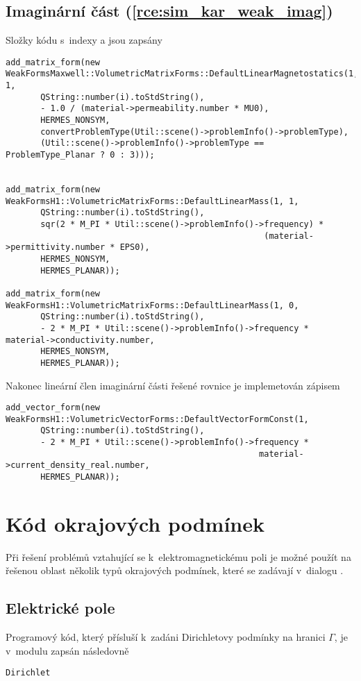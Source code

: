 \subsection*{Imaginární část (\ref{rce:sim_kar_weak_imag})}
Složky kódu s~indexy  a  jsou zapsány
\begin{verbatim}
add_matrix_form(new WeakFormsMaxwell::VolumetricMatrixForms::DefaultLinearMagnetostatics(1, 1,
       QString::number(i).toStdString(),
       - 1.0 / (material->permeability.number * MU0),
       HERMES_NONSYM,
       convertProblemType(Util::scene()->problemInfo()->problemType),
       (Util::scene()->problemInfo()->problemType == ProblemType_Planar ? 0 : 3)));


add_matrix_form(new WeakFormsH1::VolumetricMatrixForms::DefaultLinearMass(1, 1,
       QString::number(i).toStdString(),
       sqr(2 * M_PI * Util::scene()->problemInfo()->frequency) *
                                                    (material->permittivity.number * EPS0),
       HERMES_NONSYM,
       HERMES_PLANAR));
       
add_matrix_form(new WeakFormsH1::VolumetricMatrixForms::DefaultLinearMass(1, 0,
       QString::number(i).toStdString(),
       - 2 * M_PI * Util::scene()->problemInfo()->frequency * material->conductivity.number,
       HERMES_NONSYM,
       HERMES_PLANAR));
\end{verbatim}
Nakonec lineární člen imaginární části řešené rovnice je implemetován zápisem
\begin{verbatim}
add_vector_form(new WeakFormsH1::VolumetricVectorForms::DefaultVectorFormConst(1,
       QString::number(i).toStdString(),
       - 2 * M_PI * Util::scene()->problemInfo()->frequency * 
                                                   material->current_density_real.number,
       HERMES_PLANAR));
\end{verbatim}


\section{Kód okrajových podmínek}
Při řešení problémů vztahující se k~elektromagnetickému poli je možné použít na řešenou oblast několik typů okrajových podmínek, které se zadávají v~dialogu . 

\subsection*{Elektrické pole}
Programový kód, který přísluší k~zadáni Dirichletovy podmínky na hranici $\Gamma$, je v~modulu zapsán následovně
\begin{verbatim}
Dirichlet
\end{verbatim}

